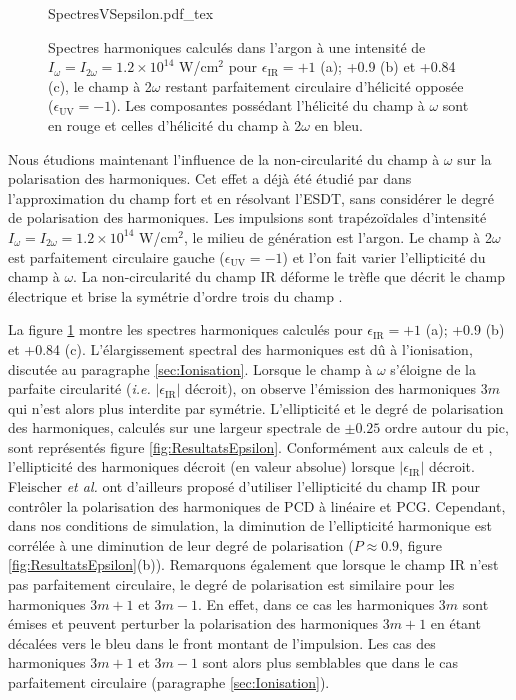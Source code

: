 \begin{figure}
\centering
\def\svgwidth{0.75\textwidth}
{SpectresVSepsilon.pdf_tex}
\caption{Spectres harmoniques calculés dans l'argon à une intensité de $I_\omega = I_{2\omega} = 1.2 \times 10^{14}$ W/cm$^2$ pour $\epsilon_{\text{IR}} = +1$ (a); +0.9 (b) et +0.84 (c), le champ à 2$\omega$ restant parfaitement circulaire d'hélicité opposée ($\epsilon_{\text{UV}} = -1$). Les composantes possédant l'hélicité du champ à $\omega$ sont en rouge et celles d'hélicité du champ à 2$\omega$ en bleu.}
\label{fig:SpectresVSepsilon}
\end{figure}

Nous étudions maintenant l'influence de la non-circularité du champ à $\omega$ sur la polarisation des harmoniques. Cet effet a déjà été étudié par  dans l'approximation du champ fort et  en résolvant l'ESDT, sans considérer le degré de polarisation des harmoniques. Les impulsions sont trapézoïdales d'intensité $I_\omega = I_{2\omega} = 1.2 \times 10^{14}$ W/cm$^2$, le milieu de génération est l'argon. Le champ à 2$\omega$ est parfaitement circulaire gauche ($\epsilon_{\text{UV}} = -1$) et l'on fait varier l'ellipticité du champ à $\omega$. La non-circularité du champ IR déforme le trèfle que décrit le champ électrique et brise la symétrie d'ordre trois du champ .

La figure \ref{fig:SpectresVSepsilon} montre les spectres harmoniques calculés pour $\epsilon_{\text{IR}} = +1$ (a); +0.9 (b) et +0.84 (c). L'élargissement spectral des harmoniques est dû à l'ionisation, discutée au paragraphe \ref{sec:Ionisation}. Lorsque le champ à $\omega$ s'éloigne de la parfaite circularité (\textit{i.e.} $|\epsilon_{\text{IR}}|$ décroit), on observe l'émission des harmoniques $3m$ qui  n'est alors plus interdite par symétrie. L'ellipticité et le degré de polarisation des harmoniques, calculés sur une largeur spectrale de $\pm 0.25$ ordre autour du pic, sont représentés figure \ref{fig:ResultatsEpsilon}. Conformément aux calculs de  et  , l'ellipticité des harmoniques décroit (en valeur absolue) lorsque $|\epsilon_{\text{IR}}|$ décroit. Fleischer \textit{et al.} ont d'ailleurs proposé d'utiliser l'ellipticité du champ IR pour contrôler la polarisation des harmoniques de PCD à linéaire et PCG. Cependant, dans nos conditions de simulation, la diminution de l'ellipticité harmonique est corrélée à une diminution de leur degré de polarisation ($P \approx 0.9$, figure \ref{fig:ResultatsEpsilon}(b)). Remarquons également que lorsque le champ IR n'est pas parfaitement circulaire, le degré de polarisation est similaire pour les harmoniques $3m+1$ et $3m-1$. En effet, dans ce cas les harmoniques $3m$ sont émises et peuvent perturber la polarisation des harmoniques $3m+1$ en étant décalées vers le bleu dans le front montant de l'impulsion. Les cas des harmoniques $3m+1$ et $3m-1$ sont alors plus semblables que dans le cas parfaitement circulaire (paragraphe \ref{sec:Ionisation}).

